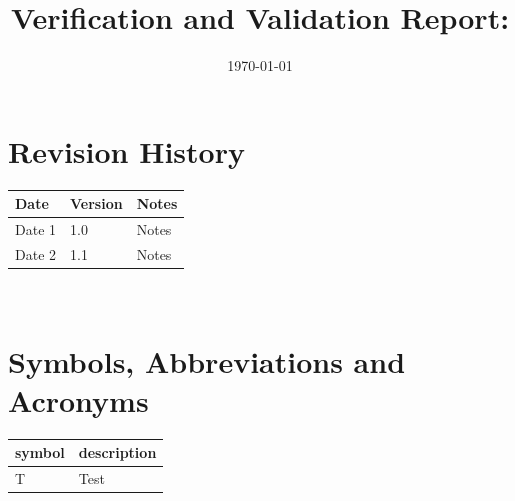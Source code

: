 \documentclass[12pt, titlepage]{article}
\begin{document}
\title{Verification and Validation Report: \progname} 
\author{\authname}
\date{\today}
	
\maketitle


\section{Revision History}

\begin{tabularx}{\textwidth}{p{3cm}p{2cm}X}
\toprule {\bf Date} & {\bf Version} & {\bf Notes}\\
\midrule
Date 1 & 1.0 & Notes\\
Date 2 & 1.1 & Notes\\
\bottomrule
\end{tabularx}

~\newpage

\section{Symbols, Abbreviations and Acronyms}

\renewcommand{\arraystretch}{1.2}
\begin{tabular}{l l} 
  \toprule		
  \textbf{symbol} & \textbf{description}\\
  \midrule 
  T & Test\\
  \bottomrule
\end{tabular}\\


\newpage

\tableofcontents

\listoftables %

\listoffigures %

\newpage

\end{document}
